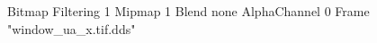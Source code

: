 {Bitmap
	{Filtering 1}
	{Mipmap 1}
	{Blend none}
	{AlphaChannel 0}
	{Frame "window_ua_x.tif.dds"}
}

